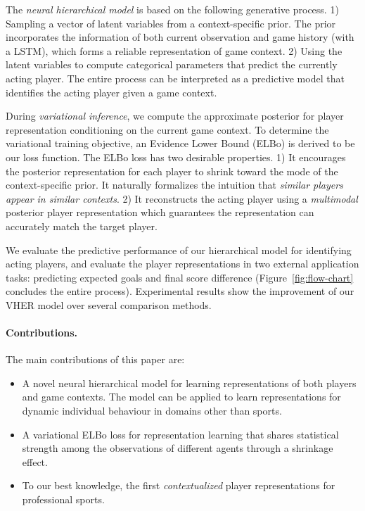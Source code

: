 \documentclass{article}
\begin{document}
The {\it neural hierarchical model} is based on the following generative process. 1) Sampling a vector of latent variables from a context-specific prior. The prior incorporates the information of both current observation and game history (with a LSTM), which forms a reliable representation of game context. 2) Using the latent variables to compute 
categorical parameters that predict the currently acting player. The entire process can be interpreted as a predictive model that identifies the acting player given a game context.

During {\it variational inference}, we compute the approximate posterior for player representation conditioning on the current game context.
To determine the variational training objective, an Evidence Lower Bound (ELBo) is derived to be our loss function. 
The ELBo loss has two desirable properties. 1) It encourages the posterior representation for each player to shrink toward the mode of the context-specific prior. It naturally formalizes the intuition that {\em similar players appear in similar contexts}. 2) It reconstructs the acting player using a {\em multimodal} posterior player representation which guarantees the representation can accurately match the target player. 

We evaluate the predictive performance of our hierarchical model for identifying acting players, and evaluate the player representations in two external application tasks: predicting expected goals and final score difference (Figure~\ref{fig:flow-chart} concludes the entire process). Experimental results show the improvement of our VHER model over several comparison methods.

\paragraph{Contributions.} The main contributions of this paper are:

\begin{itemize}
 \item A novel neural hierarchical model for learning representations of both players and game contexts. The model can be applied to learn representations for dynamic individual behaviour in domains other than sports. 
 \item A variational ELBo loss for representation learning that shares statistical strength among the observations of different agents through a shrinkage effect.
 \item To our best knowledge, the first {\em contextualized} player representations for professional sports.
\end{itemize}
\end{document}
